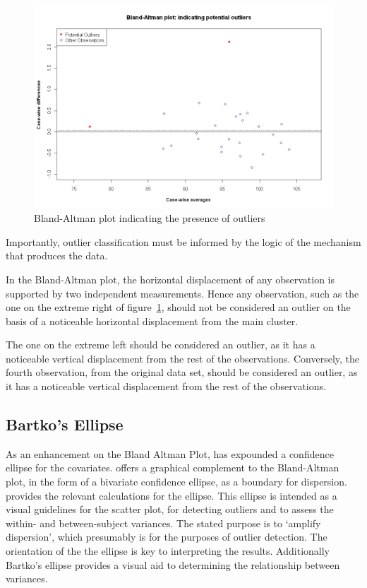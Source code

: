 \documentclass[12pt, a4paper]{report}
\theoremstyle{plain}
\theoremstyle{definition}
\theoremstyle{remark}
\begin{document}
	
	\begin{figure}[h!]
		\begin{center}
			\includegraphics[width=125mm]{images/BAOutliers.jpeg}
			\caption{Bland-Altman plot indicating the presence of outliers}\label{BAOutliers}
		\end{center}
	\end{figure}
Importantly, outlier classification must be informed by the logic of the mechanism that produces the data. 

In the Bland-Altman plot, the horizontal displacement of any observation is supported by two independent measurements. Hence any observation, such as the one on the extreme right of figure~\ref{BAOutliers}, should not be considered an outlier on the basis of a noticeable horizontal displacement from the main cluster. 

The one	on the extreme left should be considered an outlier, as it has a noticeable vertical displacement from the rest of the observations. Conversely, the fourth observation, from the original data set, should be considered an outlier, as it has a noticeable vertical displacement from the rest of the observations.








\subsection{Bartko's Ellipse}




As an enhancement on the Bland Altman Plot, \citet{Bartko} has
expounded a confidence ellipse for the covariates. \citet{Bartko} offers a graphical complement to the Bland-Altman
plot, in the form of a bivariate confidence ellipse, as a boundary for dispersion. \citet{AltmanEllipse} provides the relevant calculations for the ellipse. This ellipse is intended as a visual
guidelines for the scatter plot, for detecting outliers and to
assess the within- and between-subject variances. The stated purpose is to `amplify dispersion', which presumably is for the purposes of outlier detection. The orientation of the the ellipse is key to interpreting the results.
Additionally Bartko's ellipse provides a visual aid to determining the
relationship between variances. 
\end{document}
